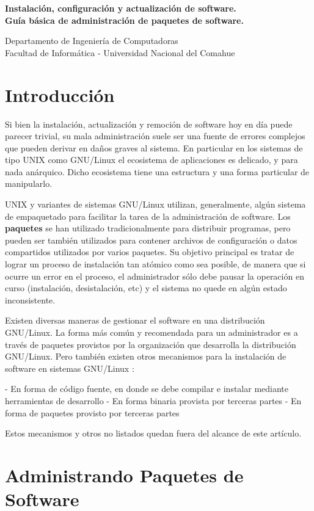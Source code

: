 \documentclass[12pt]{article}
\def\maketitle{

 \makeatletter
 {\color{bl} \centering \huge \sc \textbf{
  Instalación, configuración y actualización de software.\\ 
\large \vspace*{-8pt} \color{black} Guía básica de administración de paquetes de software. 
 \vspace*{8pt} }\par}
 \makeatother

\makeatletter
 {\centering \small 
 	Departamento de Ingeniería de Computadoras \\
 	Facultad de Informática - Universidad Nacional del Comahue \\
 	\vspace{20pt} }
 \makeatother

}
\begin{document}
\thispagestyle{empty}
\maketitle
\setlength{\parindent}{0pt}

\section*{Introducción}

Si bien la instalación, actualización y remoción de software hoy en día
puede parecer trivial, su mala administración suele ser una fuente de 
errores complejos que pueden derivar en daños graves al sistema. 
En particular en los sistemas de tipo UNIX como GNU/Linux el ecosistema
de aplicaciones es delicado, y para nada anárquico. Dicho ecosistema tiene 
una estructura y una forma particular de manipularlo. 

UNIX y variantes de sistemas GNU/Linux utilizan, generalmente, algún
sistema de empaquetado para facilitar la tarea de la administración de software.
Los {\bf paquetes} se han utilizado tradicionalmente para distribuir programas,
pero pueden ser también utilizados para contener archivos de configuración
o datos compartidos utilizados por varios paquetes. Su objetivo principal
es tratar de lograr un proceso de instalación tan atómico como sea posible,
de manera que si ocurre un error en el proceso, el administrador
sólo debe pausar la operación en curso (instalación, desistalación, etc)
y el sistema no quede en algún estado inconsistente.

Existen diversas maneras de gestionar el software en una distribución 
GNU/Linux. La forma más común y recomendada para un administrador es a través de paquetes
provistos por la organización que desarrolla la distribución GNU/Linux.
Pero también existen otros mecanismos
para la instalación de software en sistemas GNU/Linux :

- En forma de código fuente, en donde se debe compilar e instalar mediante herramientas de desarrollo
- En forma binaria provista por terceras partes
- En forma de paquetes provisto por terceras partes

Estos mecanismos y otros no listados quedan fuera del alcance de este artículo.

\section*{Administrando Paquetes de Software}
\end{document}

